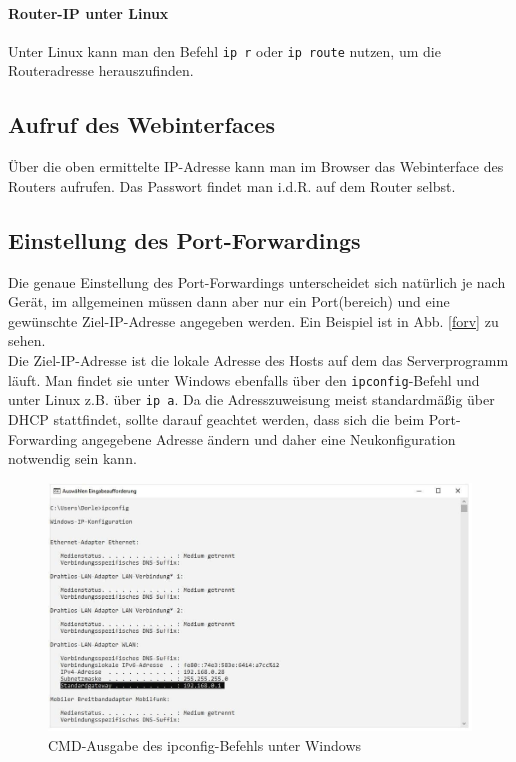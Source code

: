 \documentclass[11pt, a4paper]{article}
\newcommand{\code}[1]{{\lstinline{#1}}}
\begin{document}
\paragraph{Router-IP unter Linux}
Unter Linux kann man den Befehl \code{ip r} oder \code{ip route} nutzen, um die
Routeradresse herauszufinden.

\subsection{Aufruf des Webinterfaces}
Über die oben ermittelte IP-Adresse kann man im Browser das Webinterface des
Routers aufrufen. Das Passwort findet man i.d.R. auf dem Router selbst.

\subsection{Einstellung des Port-Forwardings}
Die genaue Einstellung des Port-Forwardings unterscheidet sich natürlich je nach
Gerät, im allgemeinen müssen dann aber nur ein Port(bereich) und eine gewünschte
Ziel-IP-Adresse angegeben werden. Ein Beispiel ist in Abb. \ref{forv} zu sehen.\\

Die Ziel-IP-Adresse ist die lokale Adresse des Hosts auf dem das Serverprogramm
läuft. Man findet sie unter Windows ebenfalls über den \code{ipconfig}-Befehl
und unter Linux z.B. über \code{ip a}. Da die Adresszuweisung meist standardmäßig
über DHCP stattfindet, sollte darauf geachtet werden, dass sich die beim
Port-Forwarding angegebene Adresse ändern und daher eine Neukonfiguration
notwendig sein kann.

\begin{figure}[H]
\includegraphics[width=\textwidth]{graphics/gatewayip_windows}
\caption{CMD-Ausgabe des ipconfig-Befehls unter Windows}\label{gwin}
\end{figure}
\end{document}
